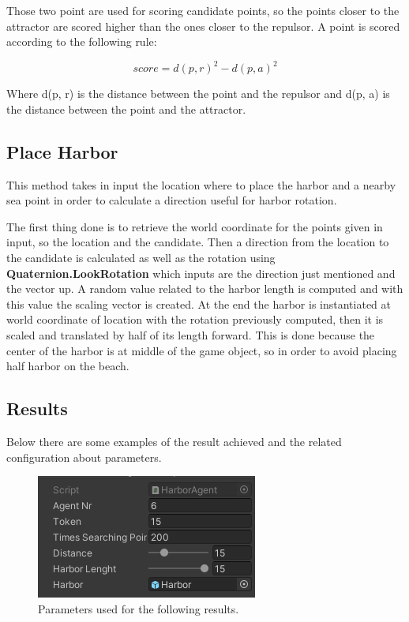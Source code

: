 \documentclass[12pt]{article}
\begin{document}
    Those two point are used for scoring candidate points, so the points closer to the attractor are scored higher than the ones closer to the repulsor. A point is scored 
    according to the following rule:

    \begin{equation}
        score = d(p, r)^2 - d(p, a)^2
    \end{equation}

    \noindent
    Where d(p, r) is the distance between the point and the repulsor and d(p, a) is the distance between the point and the attractor.

    \subsection{Place Harbor} \label{section:PlaceHarbor}
    This method takes in input the location where to place the harbor and a nearby sea point in order to calculate a direction useful for harbor rotation.
    
    The first thing done is to retrieve the world coordinate for the points given in input, so the location and the candidate. Then a direction from the location to the 
    candidate is calculated as well as the rotation using \textbf{Quaternion.LookRotation} which inputs are the direction just mentioned and the vector up. A random value 
    related to the harbor length is computed and with this value the scaling vector is created. At the end the harbor is instantiated at world coordinate of location with 
    the rotation previously computed, then it is scaled and translated by half of its length forward. This is done because the center of the harbor is at middle of the game
    object, so in order to avoid placing half harbor on the beach.

    \subsection{Results}
    Below there are some examples of the result achieved and the related configuration about parameters.

    \begin{figure}[H]
        \centering
        \includegraphics[scale = 0.8]{images/Harbor agent/Parameters 1}
        \caption{Parameters used for the following results.}
    \end{figure}
\end{document}
